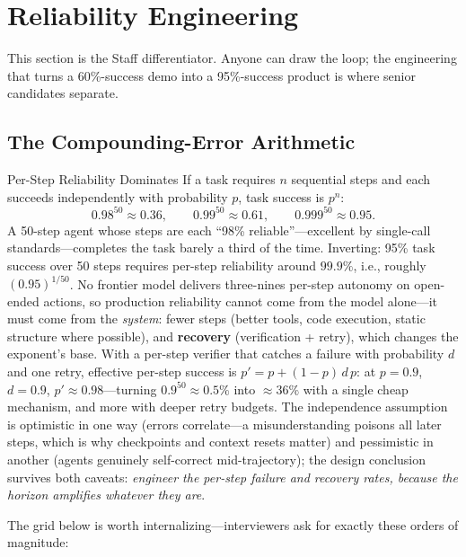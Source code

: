 \section{Reliability Engineering}
\label{sec:agent_reliability}

This section is the Staff differentiator. Anyone can draw the loop; the engineering that turns a 60\%-success demo into a 95\%-success product is where senior candidates separate.

\subsection{The Compounding-Error Arithmetic}

\begin{mathresult}{Per-Step Reliability Dominates}
If a task requires $n$ sequential steps and each succeeds independently with probability $p$, task success is $p^n$:
\[
0.98^{50} \approx 0.36, \qquad 0.99^{50} \approx 0.61, \qquad 0.999^{50} \approx 0.95.
\]
A 50-step agent whose steps are each ``98\% reliable''---excellent by single-call standards---completes the task barely a third of the time. Inverting: 95\% task success over 50 steps requires per-step reliability around $99.9\%$, i.e., roughly $(0.95)^{1/50}$. No frontier model delivers three-nines per-step autonomy on open-ended actions, so production reliability cannot come from the model alone---it must come from the \textit{system}: fewer steps (better tools, code execution, static structure where possible), and \textbf{recovery} (verification + retry), which changes the exponent's base. With a per-step verifier that catches a failure with probability $d$ and one retry, effective per-step success is $p' = p + (1-p)\,d\,p$: at $p = 0.9$, $d = 0.9$, $p' \approx 0.98$---turning $0.9^{50} \approx 0.5\%$ into $\approx 36\%$ with a single cheap mechanism, and more with deeper retry budgets. The independence assumption is optimistic in one way (errors correlate---a misunderstanding poisons all later steps, which is why checkpoints and context resets matter) and pessimistic in another (agents genuinely self-correct mid-trajectory); the design conclusion survives both caveats: \textit{engineer the per-step failure and recovery rates, because the horizon amplifies whatever they are}.
\end{mathresult}

The grid below is worth internalizing---interviewers ask for exactly these orders of magnitude:

